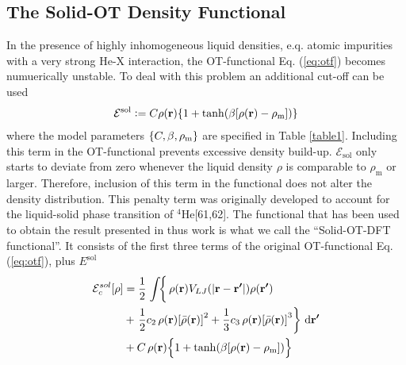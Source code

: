		\subsection{The Solid-OT Density Functional}
			In the presence of highly inhomogeneous liquid densities, e.q. atomic impurities with a very strong He-X interaction, the OT-functional Eq. (\ref{eq:otf}) becomes numuerically unstable. To deal with this problem an additional cut-off can be used
			\begin{align}
				\mathcal{E}^\mathrm{sol} \vcentcolon= C\rho(\bm{\mathrm{r}})\qty{1+\tanh(\beta\qty[\rho(\bm{\mathrm{r}})-\rho_\mathrm{m}])}
			\end{align}
			where the model parameters $\qty{C,\beta,\rho_\mathrm{m}}$ are specified in Table \ref{table1}. Including this term in the OT-functional prevents excessive density build-up. $\mathcal{E}_\mathrm{sol}$ only starts to deviate from zero whenever the liquid density $\rho$ is comparable to $\rho_\mathrm{m}$ or larger. Therefore, inclusion of this term in the functional does not alter the density distribution. This penalty term was originally developed to account for the liquid-solid phase transition of $^4$He[61,62]. The functional that has been used to obtain the result presented in thus work is what we call the ``Solid-OT-DFT functional''. It consists of the first three terms of the original OT-functional Eq. (\ref{eq:otf}), plus $E^\mathrm{sol}$
			\begin{align}
				\mathcal{E}_c^{sol}[\rho] &=  
				\frac{1}{2} \left.\int \! \right\{\rho(\bm{\mathrm{r}}) V_{LJ}(\abs{\bm{\mathrm{r}}-\bm{\mathrm{r'}}}) \rho(\bm{\mathrm{r'}}) \nonumber \\
				&+ \left.\frac{1}{2} c_2\, \rho(\bm{\mathrm{r}}) \qty[\bar\rho(\bm{\mathrm{r}})]^2 
				+ \frac{1}{3} c_3 \, \rho(\bm{\mathrm{r}}) \qty[\bar\rho(\bm{\mathrm{r}})]^3\right\}\,\mathrm{d}{\bm{\mathrm{r'}}} \nonumber \\
				&+ C\,\rho(\bm{\mathrm{r}})\qty\Big{1+\tanh(\beta\qty[\rho(\bm{\mathrm{r}})-\rho_\mathrm{m}])} \label{eq:solid-otf}
			\end{align}

